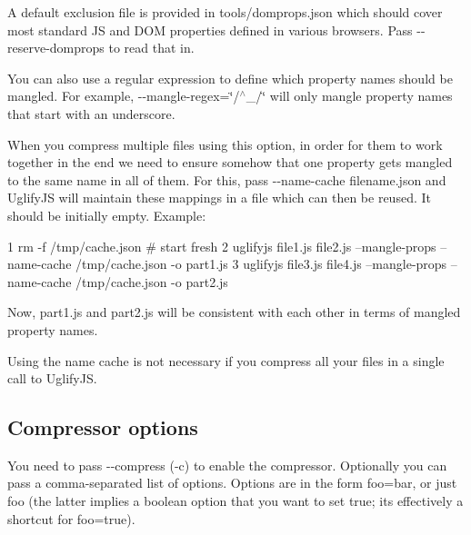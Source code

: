 A default exclusion file is provided in {\ttfamily tools/domprops.\+json} which should cover most standard J\+S and D\+O\+M properties defined in various browsers. Pass {\ttfamily -\/-\/reserve-\/domprops} to read that in.

You can also use a regular expression to define which property names should be mangled. For example, {\ttfamily -\/-\/mangle-\/regex=\char`\"{}/$^\wedge$\+\_\+/\char`\"{}} will only mangle property names that start with an underscore.

When you compress multiple files using this option, in order for them to work together in the end we need to ensure somehow that one property gets mangled to the same name in all of them. For this, pass {\ttfamily -\/-\/name-\/cache filename.\+json} and Uglify\+J\+S will maintain these mappings in a file which can then be reused. It should be initially empty. Example\+:


\begin{DoxyCode}
1 rm -f /tmp/cache.json  # start fresh
2 uglifyjs file1.js file2.js --mangle-props --name-cache /tmp/cache.json -o part1.js
3 uglifyjs file3.js file4.js --mangle-props --name-cache /tmp/cache.json -o part2.js
\end{DoxyCode}


Now, {\ttfamily part1.\+js} and {\ttfamily part2.\+js} will be consistent with each other in terms of mangled property names.

Using the name cache is not necessary if you compress all your files in a single call to Uglify\+J\+S.

\subsection*{Compressor options}

You need to pass {\ttfamily -\/-\/compress} ({\ttfamily -\/c}) to enable the compressor. Optionally you can pass a comma-\/separated list of options. Options are in the form {\ttfamily foo=bar}, or just {\ttfamily foo} (the latter implies a boolean option that you want to set {\ttfamily true}; it\textquotesingle{}s effectively a shortcut for {\ttfamily foo=true}).


